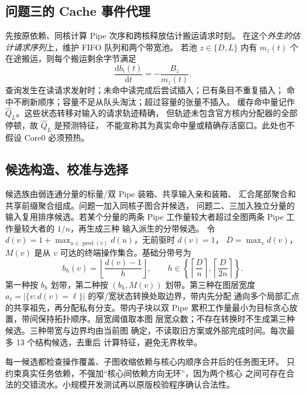 \subsection{问题三的 Cache 事件代理}
先按原依赖、同核计算 Pipe 次序和跨核释放估计搬运请求时刻。
在这个\emph{外生的估计请求序列}上，维护 FIFO 队列和两个带宽池。
若池 $z\in\{D,L\}$ 内有 $m_z(t)$ 个在途搬运，则每个搬运剩余字节满足
\begin{equation}
 \frac{\mathrm d b_i(t)}{\mathrm dt}=-\frac{B_z}{m_z(t)}.
 \label{eq:fresh-pool}
\end{equation}
查询发生在读请求发射时；未命中读完成后尝试插入；已有条目不重复插入；
命中不刷新顺序；容量不足从队头淘汰；超过容量的张量不插入。
缓存命中量记作 $\widehat Q_L$。这些状态转移对输入的请求轨迹精确，
但轨迹未包含官方核内分配器的全部停顿，故 $\widehat Q_L$ 是预测特征，
不能宣称其为真实命中量或精确存活窗口。此处也不假设 Core0 必须预热。

\subsection{候选构造、校准与选择}
候选族由弱连通分量的标量/双 Pipe 装箱、共享输入亲和装箱、
汇合尾部聚合和共享前缀聚合组成。问题一加入同核子图合并候选，
问题二、三加入独立分量的输入复用排序候选。若某个分量的两条 Pipe
工作量较大者超过全图两条 Pipe 工作量较大者的 $1/n$，再生成三种
输入派生的分带候选。
令 $d(v)=1+\max_{u\in\operatorname{pred}(v)}d(u)$，无前驱时 $d(v)=1$，
$D=\max_v d(v)$，$M(v)$ 是从 $v$ 可达的终端操作集合。基础分带号为
\begin{equation}
 b_h(v)=\left\lfloor\frac{d(v)-1}{h}\right\rfloor,
 \qquad h\in\left\{\left\lceil\frac{D}{n}\right\rceil,
                         \left\lceil\frac{D}{2n}\right\rceil\right\}.
\end{equation}
第一种按 $b_h$ 划带，第二种按 $(b_h,M(v))$ 划带。第三种在图层宽度
$a_\ell=|\{v:d(v)=\ell\}|$ 的窄/宽状态转换处取边界，带内先分配
通向多个局部汇点的共享祖先，再分配私有分支。带内子块以双 Pipe
累积工作量最小为目标贪心放置，带间保持拓扑顺序。层宽阈值取本图
层宽众数；不存在转换时不生成第三种候选。三种带宽与边界均由当前图
确定，不读取旧方案或外部完成时间。每次最多 13 个结构候选，去重后
计算特征，避免无界枚举。

每一候选都检查操作覆盖、子图收缩依赖与核心内顺序合并后的任务图无环。
只约束真实任务依赖，不强加“核心间依赖方向无环”，因为两个核心
之间可存在合法的交错流水。小规模开发测试再以原版校验程序确认合法性。

